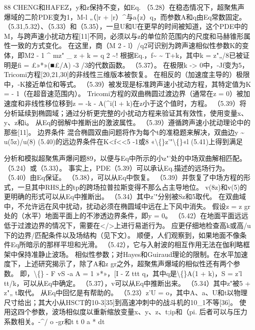 \documentclass[UTF8,11pt,a4paper,openany,fontset=fandol]{ctexbook}
\begin{document}
88 CHENG和HAFEZ，y和z保持不变，如Eq. （5.28）在稳态情况下，超聚焦声爆域的二阶PDE变为1，M-l „（|r + |r）\textasciicircum{}与a\{z）q，而参数A和q由Eq常数固定。 （5.31,5.32）、（5.33）和（5.35），一旦U和U在更早的时间被知道，这个PDE中的M，与跨声速小扰动方程[11]不同，必须以与z的单位阶范围内的尺度和马赫锥形属性一致的方式变化。 在这里，商（M 2 - l）/q2可识别为跨声速相似性参数K的变体，即M2 - 1 \textasciicircum{} mz" \_ z + k = q 2 \textasciitilde{}! 根据Eq.，f\textasciitilde{} \textasciitilde{} T+k，其中k = z"„/8已被证明是fi = £»*»(■£/A) -3 /3的代数函数。 （5.37）。 在极限k -> 0中，-Jf变为5，Tricomi方程[20,21,30]的非线性三维版本被恢复。 在相反的（加速度主导的）极限中，-K接近单位和等式。 （5.39）被发现是标准跨声速小扰动方程，其特定值为K = - 1（在超音速范围内）。 Tricomi方程的双曲椭圆过渡边界（通常在z = 0）被加速度和非线性移位移到z = -k - A(\textasciicircum{}i(l + k)在z小于这个值时，方程。 （5.39）将分析延续到椭圆域；通过分析更完整的小扰动方程来验证其有效性，使用变量x、y、z和i。 从Eq的弱解中推断出的激波属性。 （5.39）遵循跨声速小扰动理论中的那些[11]。 边界条件 混合椭圆双曲问题将作为每个t的准稳题来解决，双曲边y \textasciitilde{} u(5z)/u(8) (5.40)的远边界条件在K<f<<5 -1或8 «\textbackslash\{\}z'"\textbackslash\{\}«l (5.41)上得到满足

分析和模拟超聚焦声爆问题89，以便与Eq中所示的小z"'处的中场双曲解相匹配。 （5.24）或（5.33）。 事实上，PDE（5.39）可以承认Eq.描述的远场行为。 （5.40）由Eq保证。 （5.38），可以从Eq中恢复。 （5.39）并恢复了中场方程的形式，一旦其中RHS上的tp的跨场拉普拉斯变得不那么占主导地位。 v(8z)和v(5)的更明确的形式可以从Eq中推断出。 （5.34）其中z'"分别被Sz和5取代。 在双曲域中，不允许远在风中扰动，扰动必须在椭圆域中远在上下风中消失。 假设z = z gr处的（水平）地面平面上的不渗透边界条件，即y = 0。 （5.42）在地面平面远远低于过渡边界的情况下，需要在</>上进行易逝行为。 应更仔细地检查高k或高/u下的边界/匹配条件以及场结构（见下文）。 顺便，人们观察到，如果地面不像条件Eq所暗示的那样平坦和光滑。 （5.42），它与入射波的相互作用无法在伽利略框架中保持准静止波场。 相似性参数；对Hayes和Guiraud理论的限制。在水平加速度下，上述研究揭示了，除了A和z gr之外，超聚焦声爆域的相似性还有两个参数。 即，\textbackslash\{\} - F vS -a A = 1 »*»，[I - Z ttt q，其中q是\textbackslash\{\}A(1 + k)，S = z'l tt/k，可以从Eq中确定。 （5.37），v可以从Eq中推断出来。 （5.34）其中z"被5 + z"„ t取代。 从Eq中回忆是有帮助的。 （5.23）z'U = o，其中A、a、U和t以物理尺寸给出；其大小从HSCT的10-3[35]到高速冲刺中的战斗机的10\_1不等[36]。 使用这四个参数，波场相似度以重新缩放变量x、y、z、t;ip和（pi. 后者可以与压力系数相关。-\textasciicircum{}/ o -gr和t t 0 a * dt
\end{document}
